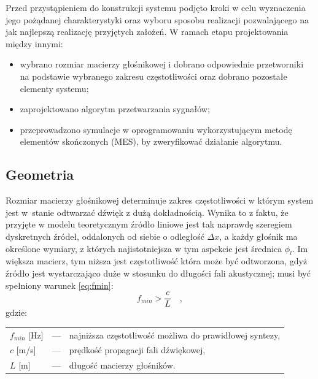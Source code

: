 \documentclass[10pt, a4paper]{article}
\let\Oldsubsection\subsection
\renewcommand{\subsection}{\FloatBarrier\Oldsubsection}
\begin{document}
Przed przystąpieniem do konstrukcji systemu podjęto kroki w celu wyznaczenia
jego pożądanej charakterystyki oraz wyboru sposobu realizacji pozwalającego na
jak najlepszą realizację przyjętych założeń. W ramach etapu projektowania
między innymi:
\begin{itemize}
  \item wybrano rozmiar macierzy głośnikowej i dobrano odpowiednie przetworniki
    na podstawie wybranego zakresu częstotliwości oraz dobrano pozostałe elementy systemu;
  \item zaprojektowano algorytm przetwarzania sygnałów;
  \item przeprowadzono symulacje w oprogramowaniu wykorzystującym metodę
    elementów skończonych (MES), by zweryfikować działanie algorytmu.
\end{itemize}

\subsection{Geometria}

Rozmiar macierzy głośnikowej determinuje zakres częstotliwości w którym system
jest w~stanie odtwarzać dźwięk z dużą dokładnością. Wynika to z faktu, że
przyjęte w modelu teoretycznym źródło liniowe jest tak naprawdę szeregiem
dyskretnych źródeł, oddalonych od siebie o odległość $\Delta x$, a każdy
głośnik ma określone wymiary, z których najistotniejsza w tym aspekcie jest
średnica $\phi_l$. Im większa macierz, tym niższa jest częstotliwość która może
być odtworzona, gdyż źródło jest wystarczająco duże w stosunku do długości fali
akustycznej; musi być spełniony warunek \eqref{eq:fmin}:
\begin{equation}
  f_{min}>\frac{c}{L} \quad,	\label{eq:fmin}
\end{equation}
gdzie:\\
\indent \begin{tabular}{l c l}
  $f_{min}$ [\si{\hertz}] & --- & najniższa częstotliwość możliwa do prawidłowej syntezy, \\
  $c$ [\si[per-mode=symbol]{\metre\per\second}] & --- & prędkość propagacji fali dźwiękowej, \\
  $L$ [\si{\metre}] & --- & długość macierzy głośników. \\
\end{tabular}\\
\end{document}
